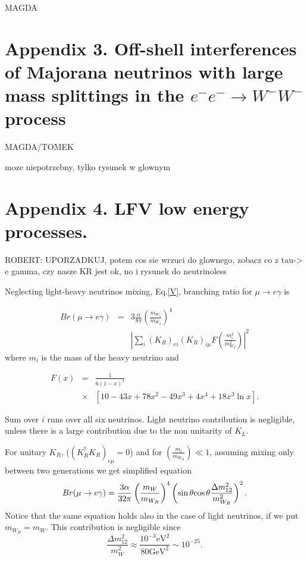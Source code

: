 \documentclass[twocolumn,superscriptaddress,showpacs,prl,nofootinbib,floatfix]{revtex4}
\begin{document}

MAGDA

\section{Appendix 3. Off-shell interferences of Majorana neutrinos with large mass splittings in the $e^-e^- \to W^-W^-$ process  \label{appll}}

MAGDA/TOMEK

moze niepotrzebny, tylko rysunek w glownym

\section{Appendix 4. LFV low energy processes.   \label{applfv}}

ROBERT: UPORZADKUJ, potem cos sie wrzuci do glownego, zobacz co z tau-> e gamma, czy nasze KR jest ok, no i rysunek do neutrinoless

Neglecting light-heavy neutrinos mixing, Eq.\ref{V}, branching ratio for $\mu\rightarrow e\gamma$ is \cite{Bu:2008fx}

\begin{eqnarray}
Br(\mu  \rightarrow  e\gamma) &=& 3 \frac{\alpha}{8\pi} \left(\frac{m_{W_{1}}}{m_{W_{2}}}\right)^{4}   \nonumber \\ 
&  & \left|  \sum_{i} \left(K_{R}^{}\right)_{ei}\left(K_{R}^{}\right)_{i\mu}F\left(\frac{m_{i}^{2}}{m_{W_{2}}^{2}}  \right)  \right|^{2}
\end{eqnarray}
where $m_{i}$ is the mass of the heavy neutrino and  

\begin{eqnarray}
F(x)&=&\frac{1}{6\left(1-x\right)^{4}} \nonumber \\
&\times & \left[10-43x+78x^{2}-49x^{3}+4x^{4}+18x^{3}\ln x\right].
\end{eqnarray}

Sum over $i$ runs over all six neutrinos. Light neutrino contribution
is negligible, unless there is a large contribution due to the non
unitarity of $K_{L}$. 

For unitary $K_{R}$, ($\left(K_{R}^{\dagger}K_{R}\right)_{e\mu}=0$)
and for $\left(\frac{m_{i}}{m_{W_{R}}}\right)\ll1$, assuming mixing
only between two generations we get simplified equation
\begin{equation}
Br(\mu\rightarrow e\gamma)=\frac{3\alpha}{32\pi}\left(\frac{m_{W}}{m_{W_{R}}}\right)^{4}\left(\sin\theta\mbox{\ensuremath{\cos\theta}}\frac{\Delta m_{12}^{2}}{m_{W_{R}}^{2}}\right)^{2}.\label{eq:mu2egamma}
\end{equation}
Notice that the same equation holds also in the case of light neutrinos,
if we put $m_{W_{R}}=m_{W}$. This contribution is negligible since
\[
\frac{\Delta m_{12}^{2}}{m_{W}^{2}}\approx\frac{10^{-3}\text{{eV}}^{2}}{80\text{{GeV}}^{2}}\sim10^{-25}.
\]
\end{document}

